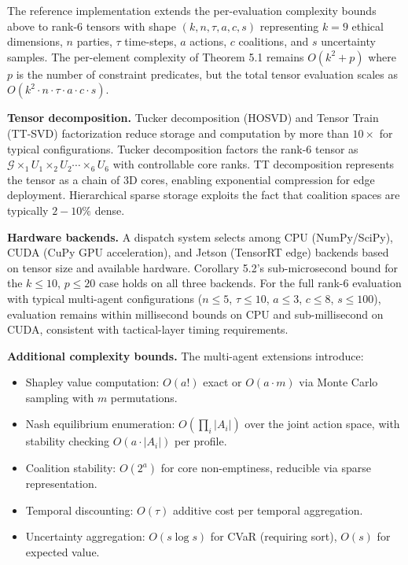 \documentclass[12pt]{article}
\theoremstyle{plain}
\theoremstyle{definition}
\theoremstyle{remark}
\begin{document}
The reference implementation extends the per-evaluation complexity bounds above to rank-6 tensors with shape \((k, n, \tau, a, c, s)\) representing \(k = 9\) ethical dimensions, \(n\) parties, \(\tau\) time-steps, \(a\) actions, \(c\) coalitions, and \(s\) uncertainty samples. The per-element complexity of Theorem 5.1 remains \(O(k^2 + p)\) where \(p\) is the number of constraint predicates, but the total tensor evaluation scales as \(O(k^2 \cdot n \cdot \tau \cdot a \cdot c \cdot s)\).

\textbf{Tensor decomposition.} Tucker decomposition (HOSVD) and Tensor Train (TT-SVD) factorization reduce storage and computation by more than \(10\times\) for typical configurations. Tucker decomposition factors the rank-6 tensor as \(\mathcal{G} \times_1 U_1 \times_2 U_2 \cdots \times_6 U_6\) with controllable core ranks. TT decomposition represents the tensor as a chain of 3D cores, enabling exponential compression for edge deployment. Hierarchical sparse storage exploits the fact that coalition spaces are typically \(2{-}10\%\) dense.

\textbf{Hardware backends.} A dispatch system selects among CPU (NumPy/SciPy), CUDA (CuPy GPU acceleration), and Jetson (TensorRT edge) backends based on tensor size and available hardware. Corollary 5.2's sub-microsecond bound for the \(k \leq 10\), \(p \leq 20\) case holds on all three backends. For the full rank-6 evaluation with typical multi-agent configurations (\(n \leq 5\), \(\tau \leq 10\), \(a \leq 3\), \(c \leq 8\), \(s \leq 100\)), evaluation remains within millisecond bounds on CPU and sub-millisecond on CUDA, consistent with tactical-layer timing requirements.

\textbf{Additional complexity bounds.} The multi-agent extensions introduce:
\begin{itemize}
\item Shapley value computation: \(O(a!)\) exact or \(O(a \cdot m)\) via Monte Carlo sampling with \(m\) permutations.
\item Nash equilibrium enumeration: \(O(\prod_i |A_i|)\) over the joint action space, with stability checking \(O(a \cdot |A_i|)\) per profile.
\item Coalition stability: \(O(2^a)\) for core non-emptiness, reducible via sparse representation.
\item Temporal discounting: \(O(\tau)\) additive cost per temporal aggregation.
\item Uncertainty aggregation: \(O(s \log s)\) for CVaR (requiring sort), \(O(s)\) for expected value.
\end{itemize}
\end{document}
